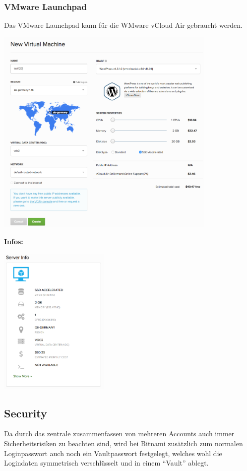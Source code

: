 \subsubsection{VMware Launchpad}
Das VMware Launchpad kann für die WMware vCloud Air gebraucht werden.

\includegraphics[width=0.8\textwidth]{./03_Analyse/03_Bitnami/images/vmware_creation}

\textbf{Infos:}

\includegraphics[width=0.4\textwidth]{./03_Analyse/03_Bitnami/images/vmware_infos}

\subsection{Security}
Da durch das zentrale zusammenfassen von mehreren Accounts auch immer 
Sicherheitsrisiken zu beachten sind, wird bei Bitnami zusätzlich zum normalen 
Loginpasswort auch noch ein Vaultpasswort festgelegt, welches wohl die 
Logindaten symmetrisch verschlüsselt und in einem ``Vault'' ablegt.

